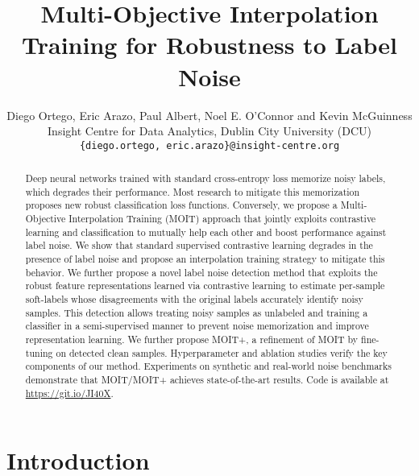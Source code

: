 \documentclass[final]{cvpr}
\begin{document}
\title{Multi-Objective Interpolation Training for Robustness to Label Noise}

\author{Diego Ortego, Eric Arazo, Paul Albert, Noel E. O'Connor and Kevin McGuinness \\
 Insight Centre for Data Analytics, Dublin City University (DCU)\\
 \texttt{\small{}{}\{diego.ortego, eric.arazo\}@insight-centre.org} }

\maketitle


\begin{abstract}


Deep neural networks trained with standard cross-entropy loss memorize noisy labels, which degrades their performance. Most research to mitigate this memorization proposes new robust classification loss functions. Conversely, we propose a Multi-Objective Interpolation Training (MOIT) approach that jointly exploits contrastive learning and classification to mutually help each other and boost performance against label noise. We show that standard supervised contrastive learning degrades in the presence of label noise and propose an interpolation training strategy to mitigate this behavior. We further propose a novel label noise detection method that exploits the robust feature representations learned via contrastive learning to estimate per-sample soft-labels whose disagreements with the original labels accurately identify noisy samples. This detection allows treating noisy samples as unlabeled and training a classifier in a semi-supervised manner to prevent noise memorization and improve representation learning. We further propose MOIT+, a refinement of MOIT by fine-tuning on detected clean samples. Hyperparameter and ablation studies verify the key components of our method. Experiments on synthetic and real-world noise benchmarks demonstrate that MOIT/MOIT+ achieves state-of-the-art results. Code is available at \url{https://git.io/JI40X}.


\end{abstract}

\section{Introduction\label{sec:Introduction}}
\end{document}
